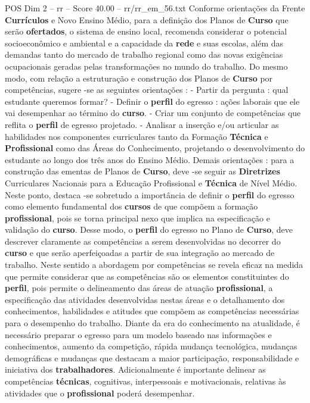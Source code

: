 \begin{textsample}{POS Dim 2 – rr – Score 40.00 – rr/rr\_em\_56.txt}
Conforme orientações da Frente \textbf{Currículos} e Novo Ensino Médio, para a definição dos Planos de \textbf{Curso} que serão \textbf{ofertados}, o sistema de ensino local, recomenda considerar o potencial socioeconômico e ambiental e a capacidade da \textbf{rede} e suas escolas, além das demandas tanto do mercado de trabalho regional como das novas exigências ocupacionais geradas pelas transformações no mundo do trabalho.
Do mesmo modo, com relação a estruturação e construção dos Planos de \textbf{Curso} por competências, sugere -se as seguintes orientações : - Partir da pergunta : qual estudante queremos formar? - Definir o \textbf{perfil} do egresso : ações laborais que ele vai desempenhar ao término do \textbf{curso}. - Criar um conjunto de competências que reflita o \textbf{perfil} de egresso projetado. - Analisar a inserção e/ou articular as habilidades nos componentes curriculares tanto da Formação \textbf{Técnica} e \textbf{Profissional} como das Áreas do Conhecimento, projetando o desenvolvimento do estudante ao longo dos três anos do Ensino Médio.
Demais orientações : para a construção das ementas de Planos de \textbf{Curso}, deve -se seguir as \textbf{Diretrizes} Curriculares Nacionais para a Educação Profissional e \textbf{Técnica} de Nível Médio.
Neste ponto, destaca -se sobretudo a importância de definir o \textbf{perfil} do egresso como elemento fundamental dos \textbf{cursos} de que compõem a formação \textbf{profissional}, pois se torna principal nexo que implica na especificação e validação do \textbf{curso}.
Desse modo, o \textbf{perfil} do egresso no Plano de \textbf{Curso}, deve descrever claramente as competências a serem desenvolvidas no decorrer do \textbf{curso} e que serão aperfeiçoadas a partir de sua integração ao mercado de trabalho.
Neste sentido a abordagem por competências se revela eficaz na medida que permite considerar que as competências são os elementos constituintes do \textbf{perfil}, pois permite o delineamento das áreas de atuação \textbf{profissional}, a especificação das atividades desenvolvidas nestas áreas e o detalhamento dos conhecimentos, habilidades e atitudes que compõem as competências necessárias para o desempenho do trabalho.
Diante da era do conhecimento na atualidade, é necessário preparar o egresso para um modelo baseado nas informações e conhecimentos, aumento da competição, rápida mudança tecnológica, mudanças demográficas e mudanças que destacam a maior participação, responsabilidade e iniciativa dos \textbf{trabalhadores}.
Adicionalmente é importante delinear as competências \textbf{técnicas}, cognitivas, interpessoais e motivacionais, relativas às atividades que o \textbf{profissional} poderá desempenhar.

\end{textsample}
